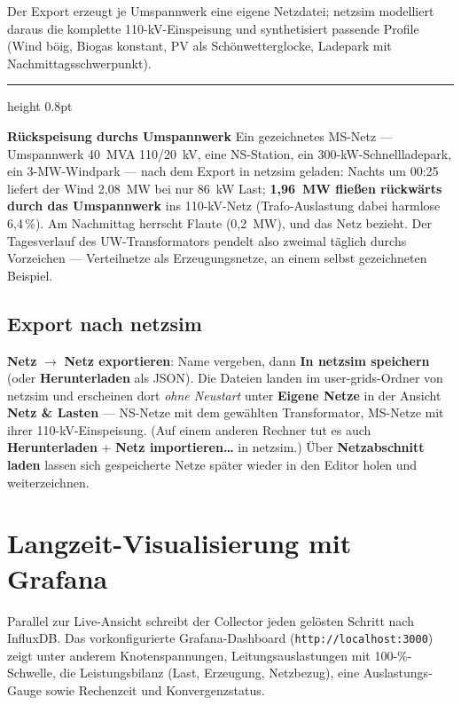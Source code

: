 \documentclass[11pt,a4paper,parskip=half]{scrreprt}
\newcommand{\ui}[1]{\textsf{\bfseries #1}}          %
\newenvironment{beispiel}[1][Beispiel]
  {\par\medskip
   {\color{bsp}\hrule height 0.8pt}\nopagebreak\smallskip
   \noindent\textbf{\textsf{\textcolor{bsp}{#1}}}\quad\ignorespaces}
  {\par\nopagebreak\smallskip{\color{bsp}\hrule height 0.8pt}\par\medskip}
\begin{document}
Der Export erzeugt je Umspannwerk eine eigene Netzdatei; netzsim
modelliert daraus die komplette 110-kV-Einspeisung und synthetisiert
passende Profile (Wind böig, Biogas konstant, PV als
Schönwetterglocke, Ladepark mit Nachmittagsschwerpunkt).

\begin{beispiel}[Rückspeisung durchs Umspannwerk]
Ein gezeichnetes MS-Netz --- Umspannwerk 40~MVA 110/20~kV, eine
NS-Station, ein 300-kW-Schnellladepark, ein 3-MW-Windpark --- nach
dem Export in netzsim geladen: Nachts um 00:25 liefert der Wind
2{,}08~MW bei nur 86~kW Last; \textbf{1{,}96~MW fließen rückwärts
durch das Umspannwerk} ins 110-kV-Netz (Trafo-Auslastung dabei
harmlose 6{,}4\,\%). Am Nachmittag herrscht Flaute (0{,}2~MW), und
das Netz bezieht. Der Tagesverlauf des UW-Transformators pendelt
also zweimal täglich durchs Vorzeichen --- Verteilnetze als
Erzeugungsnetze, an einem selbst gezeichneten Beispiel.
\end{beispiel}

\section{Export nach netzsim}

\ui{Netz} $\rightarrow$ \ui{Netz exportieren}: Name vergeben, dann
\ui{In netzsim speichern} (oder \ui{Herunterladen} als JSON). Die
Dateien landen im user-grids-Ordner von netzsim und erscheinen dort
\emph{ohne Neustart} unter \ui{Eigene Netze} in der Ansicht
\ui{Netz \& Lasten} --- NS-Netze mit dem gewählten Transformator,
MS-Netze mit ihrer 110-kV-Einspeisung. (Auf einem anderen Rechner
tut es auch \ui{Herunterladen} + \ui{Netz importieren…} in netzsim.)
Über \ui{Netzabschnitt laden} lassen sich gespeicherte Netze später
wieder in den Editor holen und weiterzeichnen.

\chapter{Langzeit-Visualisierung mit Grafana}
\label{ch:grafana}

Parallel zur Live-Ansicht schreibt der Collector jeden gelösten
Schritt nach InfluxDB. Das vorkonfigurierte Grafana-Dashboard
(\texttt{http://localhost:3000}) zeigt unter anderem
Knotenspannungen, Leitungsauslastungen mit 100-\%-Schwelle,
die Leistungsbilanz (Last, Erzeugung, Netzbezug), eine
Auslastungs-Gauge sowie Rechenzeit und Konvergenzstatus.
\end{document}
